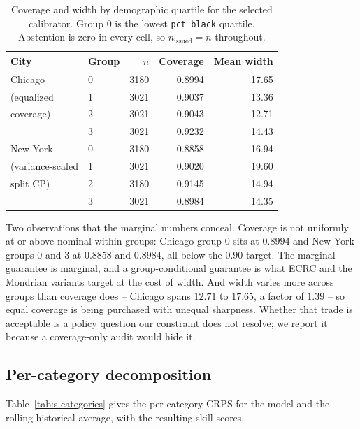 \documentclass[journal,10pt,onecolumn]{IEEEtran}
\begin{document}
\begin{table}[!t]
  \centering
  \caption{Coverage and width by demographic quartile for the selected
  calibrator. Group $0$ is the lowest \texttt{pct\_black} quartile. Abstention is
  zero in every cell, so $n_{\mathrm{issued}} = n$ throughout.}
  \label{tab:s-groups}
  \begin{tabular}{l l r r r}
    \toprule
    \textbf{City} & \textbf{Group} & $n$ & \textbf{Coverage}
    & \textbf{Mean width} \\
    \midrule
    Chicago & 0 & 3180 & 0.8994 & 17.65 \\
    (equalized & 1 & 3021 & 0.9037 & 13.36 \\
    coverage) & 2 & 3021 & 0.9043 & 12.71 \\
            & 3 & 3021 & 0.9232 & 14.43 \\
    \addlinespace
    New York & 0 & 3180 & 0.8858 & 16.94 \\
    (variance-scaled & 1 & 3021 & 0.9020 & 19.60 \\
    split CP) & 2 & 3180 & 0.9145 & 14.94 \\
            & 3 & 3021 & 0.8984 & 14.35 \\
    \bottomrule
  \end{tabular}
\end{table}

Two observations that the marginal numbers conceal. Coverage is not uniformly at
or above nominal within groups: Chicago group $0$ sits at $0.8994$ and New York
groups $0$ and $3$ at $0.8858$ and $0.8984$, all below the $0.90$ target. The
marginal guarantee is marginal, and a group-conditional guarantee is what ECRC and
the Mondrian variants target at the cost of width. And width varies more across
groups than coverage does -- Chicago spans $12.71$ to $17.65$, a factor of
$1.39$ -- so equal coverage is being purchased with unequal sharpness. Whether
that trade is acceptable is a policy question our constraint does not resolve; we
report it because a coverage-only audit would hide it.

\subsection{Per-category decomposition}
\label{sec:s5-categories}

Table~\ref{tab:s-categories} gives the per-category CRPS for the model and the
rolling historical average, with the resulting skill scores.
\end{document}

